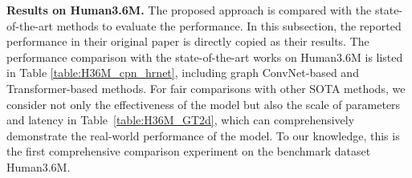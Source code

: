 \documentclass{article}
\begin{document}
\begin{table*}
{\begin{tabular}{l|c|c|c|c|c|c|c|c|c|c|c|c|c|c|c|c}
    \hline
    \end{tabular}
    }
    \label{table:H36M_cpn_hrnet}
\end{table*}




\begin{table}
    \scriptsize
    \centering
    \caption{\small Results on Human3.6M with ground-truth 2D poses as input. Our method with subtraction feature representation is marked with *. The latency is measured with batch size = 1.}
    \vspace{-0.1in}
    \label{table:H36M_GT2d}
    \vspace{-2mm}
\end{table}
\noindent \textbf{Results on Human3.6M.} The proposed approach is compared with the state-of-the-art methods to evaluate the performance. In this subsection, the reported performance in their original paper is directly copied as their results.
The performance comparison with the state-of-the-art works on Human3.6M \cite{Ionescu_POSE_TPAMI14} is listed in Table \ref{table:H36M_cpn_hrnet}, including graph ConvNet-based and Transformer-based methods. For fair comparisons with other SOTA methods, we consider not only the effectiveness of the model but also the scale of parameters and latency in Table~\ref{table:H36M_GT2d}, which can comprehensively demonstrate the real-world performance of the model. To our knowledge, this is the first comprehensive comparison experiment on the benchmark dataset Human3.6M. 
\end{document}
